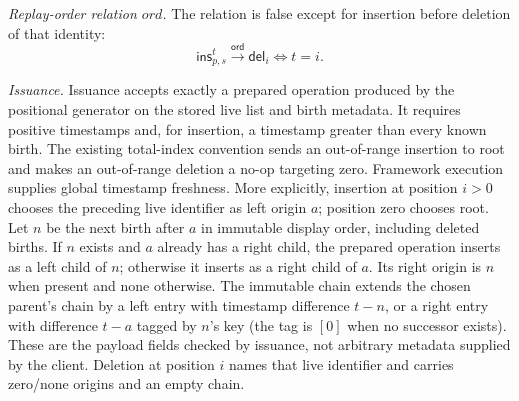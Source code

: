 \documentclass[11pt]{article}
\theoremstyle{definition}
\newcommand{\ord}{\mathrel{\xrightarrow{\mathsf{ord}}}}
\begin{document}
\emph{Replay-order relation $ord$.} The relation is false
except for insertion before deletion of that identity:
\[
 \mathsf{ins}^{t}_{p,s}\ord\mathsf{del}_i
 \Longleftrightarrow t=i.
\]

\emph{Issuance.} Issuance accepts exactly a prepared
operation produced by the positional generator on the stored live list and
birth metadata. It requires positive timestamps and, for insertion, a timestamp
greater than every known birth. The existing total-index convention sends an
out-of-range insertion to root and makes an out-of-range deletion a no-op
targeting zero. Framework execution supplies global timestamp freshness.
More explicitly, insertion at position $i>0$ chooses the preceding live
identifier as left origin $a$; position zero chooses root. Let $n$ be the next
birth after $a$ in immutable display order, including deleted births. If $n$
exists and $a$ already has a right child, the prepared operation inserts as a
left child of $n$; otherwise it inserts as a right child of $a$. Its right
origin is $n$ when present and none otherwise. The immutable chain extends
the chosen parent's chain by a left entry with timestamp difference $t-n$,
or a right entry with difference $t-a$ tagged by $n$'s key (the tag is $[0]$
when no successor exists). These are the payload fields checked by issuance,
not arbitrary metadata supplied by the client. Deletion at position $i$
names that live identifier and carries zero/none origins and an empty chain.
\end{document}
